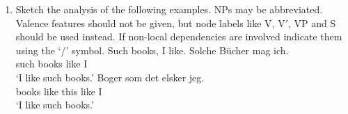 {\begin{enumerate}
\eal
\ex
\gll Arbejder Bjarne ihærdigt  på bogen?\\
     works    Bjarne seriously at book.\textsc{def}\\\danish
\glt `Does Bjarne work seriously on the book?'
\ex
\gll Arbeitet Bjarne ernsthaft an dem Buch?\\
     works    Bjarne seriously at the book\\\german
\glt `Does Bjarne work seriously on the book?'
\zl

\item Sketch the analysis of the following examples. NPs may be abbreviated. Valence features should
  not be given, but node labels like V, V$'$, VP and S should be used instead. If non-local
  dependencies are involved indicate them using the `/' symbol.
\eal
\ex Such books, I like.
\ex 
\gll Solche Bücher mag ich.\\
     such   books  like I\\\german
\glt `I like such books.'
\ex
\gll Boger som det elsker jeg.\\
     books like this like I\\\danish
\glt `I like such books.'
\zl

\end{enumerate}

}




